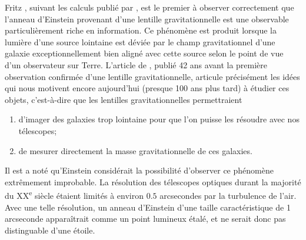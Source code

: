 Fritz \citet{Zwicky1937}, suivant les calculs publié par \citet{Einstein1936}, 
est le premier à observer correctement que l'anneau d'Einstein provenant d'une lentille gravitationnelle 
est une observable particulièrement riche en information. Ce phénomène est 
produit lorsque la lumière d'une source lointaine est déviée par le champ gravitationnel d'une galaxie 
exceptionnellement bien aligné avec cette source selon le point de vue d'un observateur sur Terre.
L'article de \citet{Zwicky1937}, publié 42 ans avant la première observation confirmée d'une lentille 
gravitationnelle, articule précisément les idées qui nous motivent encore aujourd'hui 
(presque 100 ans plus tard) à étudier ces objets, 
c'est-à-dire que les lentilles gravitationnelles permettraient
\begin{enumerate}
        \item d'imager des galaxies trop lointaine pour que l'on puisse les résoudre avec 
                nos télescopes;
        \item de mesurer directement la masse gravitationnelle de ces galaxies.
\end{enumerate}
Il est a noté qu'Einstein considérait la possibilité d'observer ce phénomène extrêmement improbable. 
La résolution des télescopes optiques durant la majorité du XX\textsuperscript{e} siècle étaient 
limités à environ $ 0.5$ arcsecondes par la turbulence de 
l'air. Avec une telle résolution, un anneau d'Einstein d'une taille caractéristique de 1 arcseconde 
apparaîtrait comme un point lumineux étalé, et ne serait donc pas distinguable d'une étoile. 



